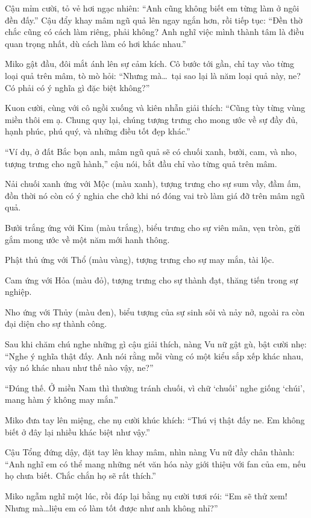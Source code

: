 \documentclass[../main.tex]{subfiles}
\begin{document}
\ct

Cậu mỉm cười, tỏ vẻ hơi ngạc nhiên: ``Anh cũng không biết em từng làm ở ngôi đền đấy.'' Cậu đẩy khay mâm ngũ quả lên ngay ngắn hơn, rồi tiếp tục: ``Đền thờ chắc cũng có cách làm riêng, phải không? Anh nghĩ việc mình thành tâm là điều quan trọng nhất, dù cách làm có hơi khác nhau.''

Miko gật đầu, đôi mắt ánh lên sự cảm kích. Cô bước tới gần, chỉ tay vào từng loại quả trên mâm, tò mò hỏi: ``Nhưng mà\dots\ tại sao lại là năm loại quả này, ne? Có phải có ý nghĩa gì đặc biệt không?''

Kuon cười, cùng với cô ngồi xuống và kiên nhẫn giải thích: ``Cũng tùy từng vùng miền thôi em ạ. Chung quy lại, chúng tượng trưng cho mong ước về sự đầy đủ, hạnh phúc, phú quý, và những điều tốt đẹp khác.''

``Ví dụ, ở đất Bắc bọn anh, mâm ngũ quả sẽ có chuối xanh, bưởi, cam, và nho, tượng trưng cho ngũ hành,'' cậu nói, bắt đầu chỉ vào từng quả trên mâm.

Nải chuối xanh ứng với Mộc (màu xanh), tượng trưng cho sự sum vầy, đầm ấm, đồn thời nó còn có ý nghia che chở khi nó đóng vai trò làm giá đỡ trên mâm ngũ quả.

Bưởi trắng ứng với Kim (màu trắng), biểu trưng cho sự viên mãn, vẹn tròn, gửi gắm mong ước về một năm mới hanh thông.

Phật thủ ứng với Thổ (màu vàng), tượng trưng cho sự may mắn, tài lộc.

Cam ứng với Hỏa (màu đỏ), tượng trưng cho sự thành đạt, thăng tiến trong sự nghiệp.

Nho ứng với Thủy (màu đen), biểu tượng của sự sinh sôi và nảy nở, ngoài ra còn đại diện cho sự thành công.

Sau khi chăm chú nghe những gì cậu giải thích, nàng Vu nữ gật gù, bật cười nhẹ: ``Nghe ý nghĩa thật đấy. Anh nói rằng mỗi vùng có một kiểu sắp xếp khác nhau, vậy nó khác nhau như thế nào vậy, ne?''

``Đúng thế. Ở miền Nam thì thường tránh chuối, vì chữ `chuối' nghe giống `chúi', mang hàm ý không may mắn.''

Miko đưa tay lên miệng, che nụ cười khúc khích: ``Thú vị thật đấy ne. Em không biết ở đây lại nhiều khác biệt như vậy.''

Cậu Tổng đứng dậy, đặt tay lên khay mâm, nhìn nàng Vu nữ đầy chân thành: ``Anh nghĩ em có thể mang những nét văn hóa này giới thiệu với fan của em, nếu họ chưa biết. Chắc chắn họ sẽ rất thích.''

Miko ngẫm nghĩ một lúc, rồi đáp lại bằng nụ cười tươi rói: ``Em sẽ thử xem! Nhưng mà\dots liệu em có làm tốt được như anh không nhỉ?''
\end{document}
